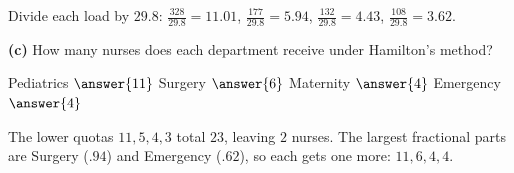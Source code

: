 \documentclass[12pt]{ximera}
\begin{document}
\begin{problem}
\begin{prompt}
\begin{feedback}
Divide each load by $29.8$: $\frac{328}{29.8}=11.01$, $\frac{177}{29.8}=5.94$,
$\frac{132}{29.8}=4.43$, $\frac{108}{29.8}=3.62$.
\end{feedback}
\end{prompt}

\begin{prompt}
\textbf{(c)} How many nurses does each department receive under Hamilton's method?

Pediatrics $\answer{11}$ \quad Surgery $\answer{6}$ \quad Maternity $\answer{4}$ \quad
Emergency $\answer{4}$

\begin{feedback}
The lower quotas $11, 5, 4, 3$ total $23$, leaving $2$ nurses. The largest fractional
parts are Surgery ($.94$) and Emergency ($.62$), so each gets one more:
$11, 6, 4, 4$.
\end{feedback}
\end{prompt}
\end{problem}
\end{document}
